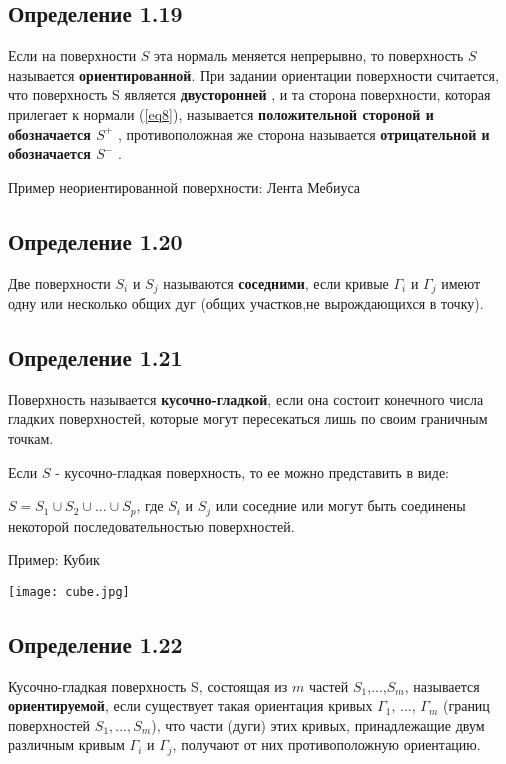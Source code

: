 \documentclass[12pt, english]{article}
\begin{document}
\subsection*{Определение 1.19}
Если на поверхности $S$ эта нормаль
меняется непрерывно, то поверхность $S$ называется \textbf{ориентированной}. При задании ориентации поверхности считается, что поверхность S является \textbf{ двусторонней }, и та сторона поверхности,
которая прилегает к нормали (\ref{eq8}), называется 
\textbf{ положительной стороной и обозначается $S^+$ }, противоположная же сторона называется 
\textbf{ отрицательной и обозначается $S^-$ }	.

Пример неориентированной поверхности: Лента Мебиуса
	

\subsection*{Определение 1.20}

Две поверхности $S_i$ и $S_j$ называются \textbf{соседними}, если кривые
$\Gamma_i$ и $\Gamma_j$ имеют одну или несколько общих дуг (общих участков,не вырождающихся в точку).

\subsection*{Определение 1.21 }
Поверхность называется \textbf{кусочно-гладкой}, если она состоит конечного числа гладких поверхностей, которые могут пересекаться лишь по своим граничным точкам.

Если $S$ - кусочно-гладкая поверхность, то ее можно представить в виде:

	$S = S_1 \cup S_2 \cup ... \cup S_p$, где $S_i$ и $S_j$ или соседние или могут быть соединены некоторой последовательностью поверхностей.
	
	Пример: Кубик
	
\texttt{[image: cube.jpg]}

\subsection*{Определение 1.22 }
Кусочно-гладкая поверхность S, состоящая из $m$ частей
$S_1$,...,$S_m$, называется \textbf{ориентируемой}, если существует такая ориентация кривых $\Gamma_1$, ..., $\Gamma_m$ (границ поверхностей $S_1,...,S_m$), что
части (дуги) этих кривых, принадлежащие двум различным кривым
$\Gamma_i$ и $\Gamma_j$, получают от них противоположную ориентацию.
\end{document}
